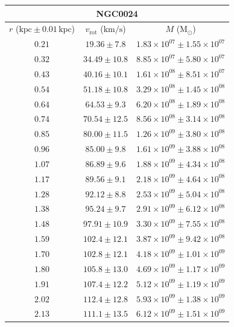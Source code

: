\documentclass{article}
\newcommand\solmass{\textrm{M}_\odot}
\newcommand\kpc{\textrm{kpc}}
\newcommand\kmps{\textrm{km}/\textrm{s}}
\newcommand\vrot{\ensuremath{v_{\textrm{rot}}}}
\begin{document}
\singlespacing
\begin{table}[h!]
    \begin{tabular}{|c|c|c|}
        \hline
        \multicolumn{3}{|c|}{NGC0024} \\
        \hline
        $r$ ($\kpc \pm 0.01 \,\kpc$) & $\vrot$ ($\kmps$) & $M$ ($\solmass$) \\
        \hline
        $0.21$ & $19.36 \pm 7.8$ & $1.83\times 10^{07} \pm 1.55\times 10^{07}$ \\
        $0.32$ & $34.49 \pm 10.8$ & $8.85\times 10^{07} \pm 5.80\times 10^{07}$ \\
        $0.43$ & $40.16 \pm 10.1$ & $1.61\times 10^{08} \pm 8.51\times 10^{07}$ \\
        $0.54$ & $51.18 \pm 10.8$ & $3.29\times 10^{08} \pm 1.45\times 10^{08}$ \\
        $0.64$ & $64.53 \pm 9.3$ & $6.20\times 10^{08} \pm 1.89\times 10^{08}$ \\
        $0.74$ & $70.54 \pm 12.5$ & $8.56\times 10^{08} \pm 3.14\times 10^{08}$ \\
        $0.85$ & $80.00 \pm 11.5$ & $1.26\times 10^{09} \pm 3.80\times 10^{08}$ \\
        $0.96$ & $85.00 \pm 9.8$ & $1.61\times 10^{09} \pm 3.88\times 10^{08}$ \\
        $1.07$ & $86.89 \pm 9.6$ & $1.88\times 10^{09} \pm 4.34\times 10^{08}$ \\
        $1.17$ & $89.56 \pm 9.1$ & $2.18\times 10^{09} \pm 4.64\times 10^{08}$ \\
        $1.28$ & $92.12 \pm 8.8$ & $2.53\times 10^{09} \pm 5.04\times 10^{08}$ \\
        $1.38$ & $95.24 \pm 9.7$ & $2.91\times 10^{09} \pm 6.12\times 10^{08}$ \\
        $1.48$ & $97.91 \pm 10.9$ & $3.30\times 10^{09} \pm 7.55\times 10^{08}$ \\
        $1.59$ & $102.4 \pm 12.1$ & $3.87\times 10^{09} \pm 9.42\times 10^{08}$ \\
        $1.70$ & $102.8 \pm 12.1$ & $4.18\times 10^{09} \pm 1.01\times 10^{09}$ \\
        $1.80$ & $105.8 \pm 13.0$ & $4.69\times 10^{09} \pm 1.17\times 10^{09}$ \\
        $1.91$ & $107.4 \pm 12.2$ & $5.12\times 10^{09} \pm 1.19\times 10^{09}$ \\
        $2.02$ & $112.4 \pm 12.8$ & $5.93\times 10^{09} \pm 1.38\times 10^{09}$ \\
        $2.13$ & $111.1 \pm 13.5$ & $6.12\times 10^{09} \pm 1.51\times 10^{09}$ \\

\end{tabular}
\end{table}
\end{document}
